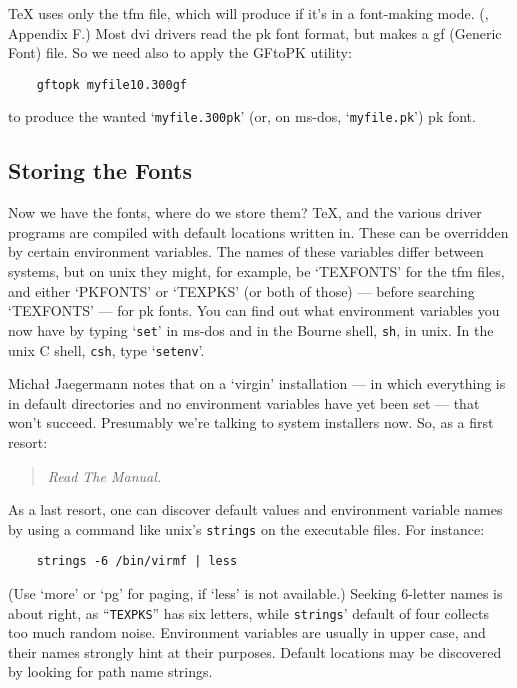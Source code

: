 \TeX{} uses only the {\sc tfm} file, which \MF{}
will produce if it's in a font-making mode.
(\MFbook{}, Appendix F.)
Most {\sc dvi} drivers read the {\sc pk} font format,
but \MF{} makes a {\sc gf} (Generic Font) file.
So we need also to apply the {\sf GFtoPK} utility:
\begin{verbatim}
    gftopk myfile10.300gf
\end{verbatim}
to produce the wanted `{\tt myfile.300pk}'
(or, on {\sc ms-dos}, `{\tt myfile.pk}')
{\sc pk} font.


\subsection{Storing the Fonts}\label{sub:store}

Now we have the fonts, where do we store them?  \TeX{}, \MF{} and
the various driver programs are compiled with default locations
written in.
These can be overridden by certain environment variables.
The names of these variables differ between systems,
but on {\sc unix} they might, for example, be `TEXFONTS' for the
{\sc tfm} files, and either `PKFONTS' or `TEXPKS' (or both of those)
--- before searching `TEXFONTS' --- for {\sc pk} fonts.
You can find out what environment variables you now have
by typing `{\tt set}' in {\sc ms-dos} and in the Bourne shell, {\tt sh},
in {\sc unix}.  In the {\sc unix} C shell, {\tt csh}, type
`{\tt setenv}'.

Micha{\l} {\sc Jaegermann} notes that on a `virgin' installation
--- in which everything is in default directories and no environment
variables have yet been set --- that won't succeed.  Presumably we're
talking to system installers now.  So, as a first resort:
\begin{quote}
    \em Read The Manual.
\end{quote}
As a last resort, one can discover default values and environment
variable names by using a command like {\sc unix}'s {\tt strings}
on the executable files.
For instance:
\begin{verbatim}
    strings -6 /bin/virmf | less
\end{verbatim}
(Use `more' or `pg' for paging, if `less' is not available.)
Seeking 6-letter names is about right, as ``{\tt TEXPKS}'' has six
letters, while {\tt strings\/}' default of four collects too much
random noise.
Environment variables are usually in upper case, and their names
strongly hint at their purposes.
Default locations may be discovered by looking for path name strings.

